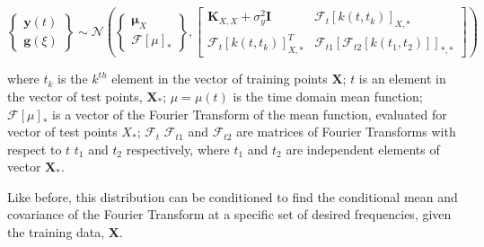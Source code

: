 \documentclass[12pt]{article}
\begin{document}
    \begin{equation}
        \left\{
            \begin{array}{c}
                \mathbf{y}(t) \\
                \mathbf{g}(\xi)
            \end{array}
            \right\}
        \sim \mathcal{N} \left(
        \left\{
        \begin{array}{c}
            \boldsymbol{\mu}_X \\
            \boldsymbol{\mathcal{F}}[{\mu}]_*
        \end{array}
        \right\},
        \left[
            \begin{array}{cc}
                \mathbf{K}_{X,X} + \sigma^2_y \mathbf{I} & \boldsymbol{\mathcal{F}}_{t} [k(t, t_k)]_{X,*} \\
                \boldsymbol{\mathcal{F}}_{t} [k(t, t_k)]_{X,*}^T & \boldsymbol{\mathcal{F}}_{t1} [\mathcal{F}_{t2} [k(t_1, t_2)]]_{*,*}
            \end{array}
            \right]
        \right)\label{eq:linear-trans}
    \end{equation}

    \noindent where $t_k$ is the $k^{th}$ element in the vector of training points $\mathbf{X}$; $t$ is an element in the vector of test points, $\mathbf{X}_*$; $\mu = \mu(t)$ is the time domain mean function; $\boldsymbol{\mathcal{F}}[\mu]_*$ is a vector of the Fourier Transform of the mean function, evaluated for vector of test points $X_*$; $\boldsymbol{\mathcal{F}}_{t}$  $\boldsymbol{\mathcal{F}}_{t1}$ and $\boldsymbol{\mathcal{F}}_{t2}$ are matrices of Fourier Transforms with respect to $t$  $t_1$ and $t_2$ respectively, where $t_1$ and $t_2$ are independent elements of vector $\mathbf{X_{*}}$.

    Like before, this distribution can be conditioned to find the conditional mean and covariance of the Fourier Transform at a specific set of desired frequencies, given the training data, $\mathbf{X}$.
\end{document}
